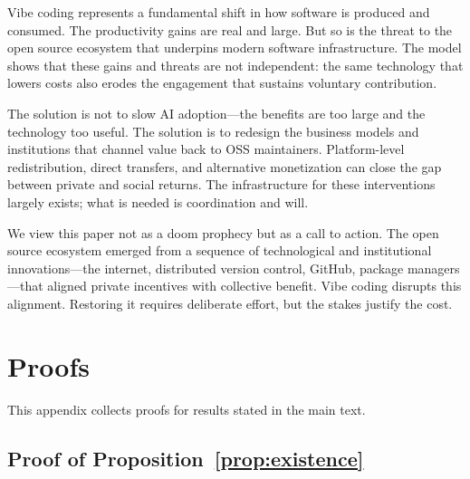 \documentclass[11pt,a4paper]{article}
\theoremstyle{definition}
\theoremstyle{remark}
\begin{document}
Vibe coding represents a fundamental shift in how software is produced and consumed. The productivity gains are real and large. But so is the threat to the open source ecosystem that underpins modern software infrastructure. The model shows that these gains and threats are not independent: the same technology that lowers costs also erodes the engagement that sustains voluntary contribution.

The solution is not to slow AI adoption---the benefits are too large and the technology too useful. The solution is to redesign the business models and institutions that channel value back to OSS maintainers. Platform-level redistribution, direct transfers, and alternative monetization can close the gap between private and social returns. The infrastructure for these interventions largely exists; what is needed is coordination and will.

We view this paper not as a doom prophecy but as a call to action. The open source ecosystem emerged from a sequence of technological and institutional innovations---the internet, distributed version control, GitHub, package managers---that aligned private incentives with collective benefit. Vibe coding disrupts this alignment. Restoring it requires deliberate effort, but the stakes justify the cost.


\appendix

\section{Proofs}\label{app:proofs}

This appendix collects proofs for results stated in the main text.

\subsection{Proof of Proposition~\ref{prop:existence}}
\end{document}
